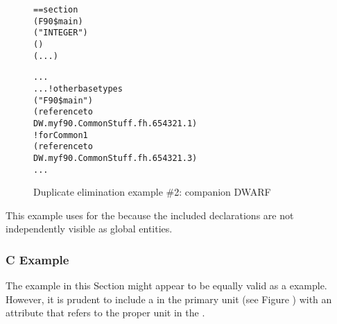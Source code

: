 \begin{figure}
\begin{dwflisting}
\begin{alltt}
== section \dotdebuginfo{}
        (F90\$main)
            ("INTEGER")
            ()
            (...)

            ...
        ...  ! other base types
            ("F90\$main")
                (reference to
                    DW.myf90.CommonStuff.fh.654321.1)
             ! for Common1
                (reference to
                    DW.myf90.CommonStuff.fh.654321.3)
            ...
\end{alltt}
\end{dwflisting}
\caption{Duplicate elimination example \#2: companion DWARF }
\label{fig:duplicateeliminationexample2companiondwarf}
\end{figure}

This example uses  for the 
because the included declarations are not independently
visible as global entities.


\subsubsection{C Example}

The  example 
in this Section might appear to be equally
valid as a  example. However, it is prudent to include
a 
in the primary unit 
(see Figure )
with an  attribute that refers to the proper unit
in the .

